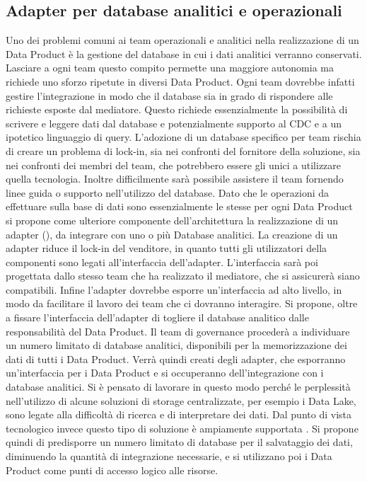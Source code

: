 \documentclass[12pt]{report}
\begin{document}
\subsection{Adapter per database analitici e operazionali}
Uno dei problemi comuni ai team operazionali e analitici nella realizzazione di un Data Product è la gestione del database in cui i dati analitici verranno conservati.
Lasciare a ogni team questo compito permette una maggiore autonomia ma richiede uno sforzo ripetute in diversi Data Product.
Ogni team dovrebbe infatti gestire l'integrazione in modo che il database sia in grado di rispondere alle richieste esposte dal mediatore.
Questo richiede essenzialmente la possibilità di scrivere e leggere dati dal database e potenzialmente supporto al CDC e a un ipotetico linguaggio di query.
L'adozione di un database specifico per team rischia di creare un problema di lock-in, sia nei confronti del fornitore della soluzione, sia nei confronti dei membri del team, che potrebbero essere gli unici a utilizzare quella tecnologia.
Inoltre difficilmente sarà possibile assistere il team fornendo linee guida o supporto nell'utilizzo del database.
Dato che le operazioni da effettuare sulla base di dati sono essenzialmente le stesse per ogni Data Product si propone come ulteriore componente dell'architettura la realizzazione di un adapter (\cite{designPatterns}), da integrare con uno o più Database analitici.
La creazione di un adapter riduce il lock-in del venditore, in quanto tutti gli utilizzatori della componenti sono legati all'interfaccia dell'adapter.
L'interfaccia sarà poi progettata dallo stesso team che ha realizzato il mediatore, che si assicurerà siano compatibili.
Infine l'adapter dovrebbe esporre un'interfaccia ad alto livello, in modo da facilitare il lavoro dei team che ci dovranno interagire.
Si propone, oltre a fissare l'interfaccia dell'adapter di togliere il database analitico dalle responsabilità del Data Product.
Il team di governance procederà a individuare un numero limitato di database analitici, disponibili per la memorizzazione dei dati di tutti i Data Product.
Verrà quindi creati degli adapter, che esporranno un'interfaccia per i Data Product e si occuperanno dell'integrazione con i database analitici.
Si è pensato di lavorare in questo modo perché le perplessità nell'utilizzo di alcune soluzioni di storage centralizzate, per esempio i Data Lake, sono legate alla difficoltà di ricerca e di interpretare dei dati. 
Dal punto di vista tecnologico invece questo tipo di soluzione è ampiamente supportata .
Si propone quindi di predisporre un numero limitato di database per il salvataggio dei dati, diminuendo la quantità di integrazione necessarie, e si utilizzano poi i Data Product come punti di accesso logico alle risorse.
\end{document}

